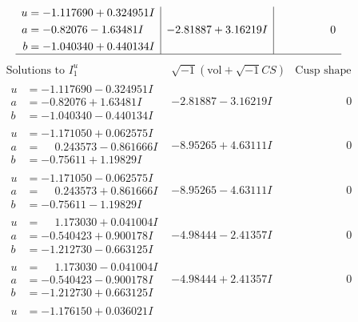 \documentclass[1p]{elsarticle_modified}
\theoremstyle{definition}
\newcommand{\I}{\sqrt{-1}}
\begin{document}
$$\begin{array}{c|c|c}
\begin{aligned}
u &= -1.117690 + 0.324951 I \\
a &= -0.82076 - 1.63481 I \\
b &= -1.040340 + 0.440134 I\end{aligned}
 & -2.81887 + 3.16219 I & \phantom{-0.000000 } 0\\
 \hline 
 \end{array}$$\newpage$$\begin{array}{c|c|c}  
\text{Solutions to }I^u_{1}& \I (\text{vol} + \sqrt{-1}CS) & \text{Cusp shape}\\
 \hline 
\begin{aligned}
u &= -1.117690 - 0.324951 I \\
a &= -0.82076 + 1.63481 I \\
b &= -1.040340 - 0.440134 I\end{aligned}
 & -2.81887 - 3.16219 I & \phantom{-0.000000 } 0 \\ \hline\begin{aligned}
u &= -1.171050 + 0.062575 I \\
a &= \phantom{-}0.243573 - 0.861666 I \\
b &= -0.75611 + 1.19829 I\end{aligned}
 & -8.95265 + 4.63111 I & \phantom{-0.000000 } 0 \\ \hline\begin{aligned}
u &= -1.171050 - 0.062575 I \\
a &= \phantom{-}0.243573 + 0.861666 I \\
b &= -0.75611 - 1.19829 I\end{aligned}
 & -8.95265 - 4.63111 I & \phantom{-0.000000 } 0 \\ \hline\begin{aligned}
u &= \phantom{-}1.173030 + 0.041004 I \\
a &= -0.540423 + 0.900178 I \\
b &= -1.212730 - 0.663125 I\end{aligned}
 & -4.98444 - 2.41357 I & \phantom{-0.000000 } 0 \\ \hline\begin{aligned}
u &= \phantom{-}1.173030 - 0.041004 I \\
a &= -0.540423 - 0.900178 I \\
b &= -1.212730 + 0.663125 I\end{aligned}
 & -4.98444 + 2.41357 I & \phantom{-0.000000 } 0 \\ \hline\begin{aligned}
u &= -1.176150 + 0.036021 I \\

\end{aligned}
\end{array}$$
\end{document}
